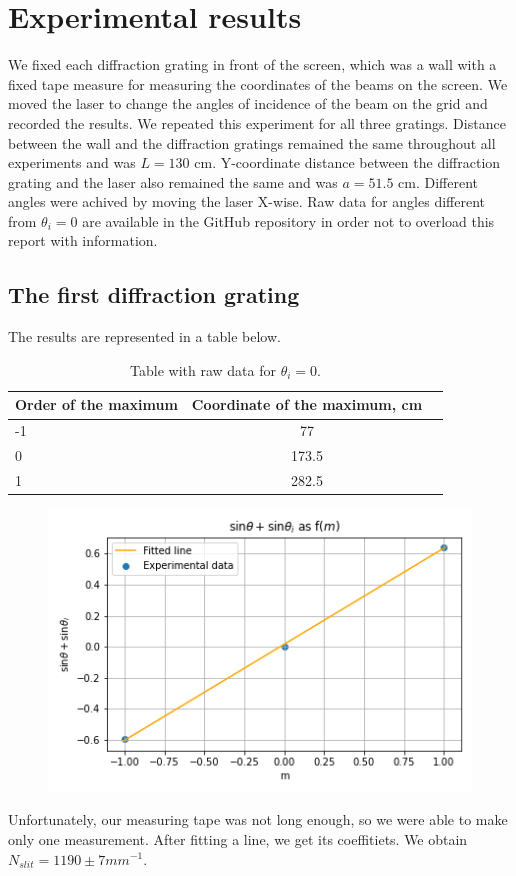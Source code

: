 \documentclass[a4paper, 12pt]{article}
\begin{document}
	\section*{Experimental results}
	We fixed each diffraction grating in front of the screen, which was a wall with a fixed tape measure for measuring the coordinates of the beams on the screen. We moved the laser to change the angles of incidence of the beam on the grid and recorded the results. We repeated this experiment for all three gratings. Distance between the wall and the diffraction gratings remained the same throughout all experiments and was $L = 130$ cm. Y-coordinate distance between the diffraction grating and the laser also remained the same and was $a = 51.5$ cm. Different angles were achived by moving the laser X-wise. Raw data for angles different from $\theta_{i} = 0$ are available in the GitHub repository in order not to overload this report with information.
	\subsection*{The first diffraction grating}
	The results are represented in a table below.
	\begin{table}[H]
		\centering
		\caption{Table with raw data for $\theta_{i} = 0$.}
		\begin{tabular}[t]{lcc}
			\hline
			Order of the maximum&Coordinate of the maximum, cm\\
			\hline
			-1&77\\
			0&173.5\\
			1&282.5\\
			\hline
		\end{tabular}
	\end{table}
	\begin{figure}[H]
		\centering
		\includegraphics[width=0.75\linewidth]{1200.png}
		\caption{}
		\label{fig:1200}
	\end{figure}
	Unfortunately, our measuring tape was not long enough, so we were able to make only one measurement. After fitting a line, we get its coeffitiets. We obtain $N_{slit} = 1190 \pm 7  mm^{-1}$.
\end{document}
